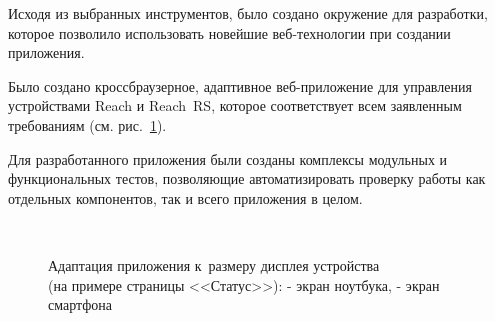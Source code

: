 \begin{dashitemize}
  \item Исходя из выбранных инструментов, было создано окружение для разработки, которое позволило использовать новейшие веб-технологии при создании приложения.
  \item Было создано кроссбраузерное, адаптивное веб-приложение для управления устройствами Reach и Reach~RS, которое соответствует всем заявленным требованиям (см. рис.~\ref{fig:status-responsive}).
  \item Для разработанного приложения были созданы комплексы модульных и функциональных тестов, позволяющие автоматизировать проверку работы как отдельных компонентов, так и всего приложения в целом.
\end{dashitemize}

\begin{figure}[h!]
  \centering
  \setlength{\fboxsep}{5pt}
  \\
  \vspace*{6pt}
  \caption{
    Адаптация приложения к~размеру дисплея устройства\\(на примере страницы <<Статус>>):
    \protect{} - экран ноутбука,
    \protect{} - экран смартфона
  }
  \label{fig:status-responsive}
\end{figure}

\newpage
